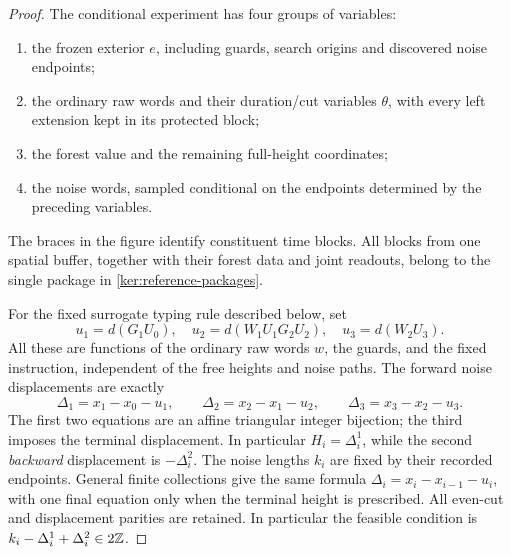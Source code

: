 \begin{proof}
The conditional experiment has four groups of variables:
\begin{enumerate}[label=(\roman*)]
\item the frozen exterior \(e\), including guards, search origins and
      discovered noise endpoints;
\item the ordinary raw words and their duration/cut variables \(\theta\),
      with every left extension kept in its protected block;
\item the forest value and the remaining full-height coordinates;
\item the noise words, sampled conditional on the endpoints determined
      by the preceding variables.
\end{enumerate}
The braces in the figure identify constituent time blocks. All blocks
from one spatial buffer, together with their forest data and joint
readouts, belong to the single package in
\eqref{ker:reference-packages}.

For the fixed surrogate typing rule described below, set
\[
 u_1=d(G_1U_0),\quad
 u_2=d(W_1U_1G_2U_2),\quad u_3=d(W_2U_3).
\]
All these are functions of the ordinary raw words \(w\), the guards,
and the fixed instruction, independent of the free heights and
noise paths.  The forward noise displacements are exactly
\begin{equation}\label{ker:triangular-heights}
 \Delta_1=x_1-x_0-u_1,\qquad
 \Delta_2=x_2-x_1-u_2,\qquad
 \Delta_3=x_3-x_2-u_3.
\end{equation}
The first two equations are an affine triangular integer bijection;
the third imposes the terminal displacement.  In particular
\(H_i=\Delta_i^1\), while the second \emph{backward} displacement
is \(-\Delta_i^2\).  The noise lengths \(k_i\) are fixed by their
recorded endpoints.  General finite collections give the same formula
\(\Delta_i=x_i-x_{i-1}-u_i\), with one final equation only when the
terminal height is prescribed.  All even-cut and displacement parities
are retained.  In particular the feasible condition is
\(k_i-\Delta_i^1+\Delta_i^2\in2\mathbb Z\).


\end{proof}
